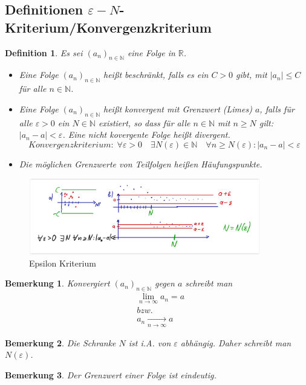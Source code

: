 \documentclass[12pt,a4paper]{report}%
\newtheorem{definition}[satz]{Definition}
\newtheorem{bem}{Bemerkung}[section]
\numberwithin{equation}{section}
\newcommand{\R}{\mathbb{R}} %
\newcommand{\N}{\mathbb{N}}
\numberwithin{equation}{subsection}
\begin{document}
  \subsection{Definitionen $\varepsilon-N$-Kriterium/Konvergenzkriterium}
  \begin{definition}
    Es sei $(a_n)_{n \in \N}$ eine Folge in $\R$.
    \begin{itemize}
      \item[a)] Eine Folge $(a_n)_{n \in \N}$ heißt beschränkt, falls es ein $C > 0$ gibt, mit $|a_n| \leq C$ für alle $n \in \N$.
      \item[b)] Eine Folge $(a_n)_{n \in \N}$ heißt konvergent mit Grenzwert (Limes) $a$, falls für alle $\varepsilon > 0$ ein $N\in \N$ existiert, so dass für alle $n \in \N$ mit $n \geq N$ gilt: $|a_n - a| < \varepsilon$. Eine nicht kovergente Folge heißt divergent.
      \begin{equation}
        Konvergenzkriterium:\; \forall \varepsilon > 0 \quad \exists N(\varepsilon) \in \N \quad \forall n \geq N(\varepsilon): |a_n -a| < \varepsilon \label{eq:folge_konvergenz}
      \end{equation}
      \item[c)] Die möglichen Grenzwerte von Teilfolgen heißen Häufungspunkte.
    \end{itemize}\label{def:folge_konvergenz}
  \end{definition}
  \begin{figure}[htbp] 
	  \centering
	  \includegraphics[width=0.9\textwidth]{folge_epsil_krit.png}
	  \caption{Epsilon Kriterium\protect\cite{HM12}}
	  \label{fig:folge_epsilon}
	\end{figure}
  \begin{bem}
    Konvergiert $(a_n)_{n \in \N}$ gegen $a$ schreibt man
    \begin{align}
      &\lim_{n \rightarrow \infty} a_n = a\\
      &bzw. \nonumber \\
      &a_n \underset{n \rightarrow \infty}{\rightarrow} a \nonumber
    \end{align}
  \end{bem}
  \begin{bem}
    Die Schranke $N$ ist i.A. von $\varepsilon$ abhängig. Daher schreibt man $N(\varepsilon)$.
  \end{bem}
  \begin{bem}
    Der Grenzwert einer Folge ist eindeutig.
  \end{bem}
  
\end{document}
